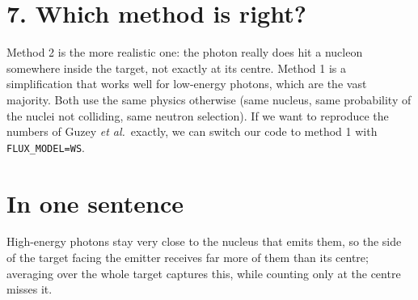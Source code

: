 \documentclass[12pt]{article}
\begin{document}
\section*{7. Which method is right?}

Method 2 is the more realistic one: the photon really does hit a nucleon somewhere inside the
target, not exactly at its centre. Method 1 is a simplification that works well for low-energy
photons, which are the vast majority. Both use the same physics otherwise (same nucleus, same
probability of the nuclei not colliding, same neutron selection). If we want to reproduce the
numbers of Guzey \textit{et al.}\ exactly, we can switch our code to method 1 with
\texttt{FLUX\_MODEL=WS}.

\section*{In one sentence}

High-energy photons stay very close to the nucleus that emits them, so the side of the target
facing the emitter receives far more of them than its centre; averaging over the whole target
captures this, while counting only at the centre misses it.
\end{document}
